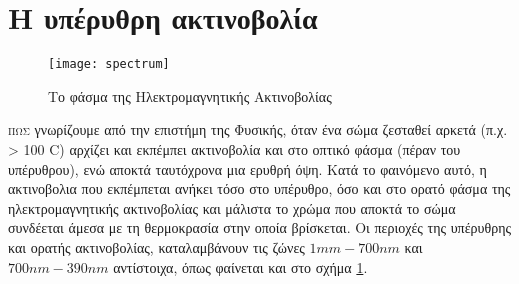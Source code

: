 


\section{Η υπέρυθρη ακτινοβολία}

\begin{figure}
  \centering
  \texttt{[image: spectrum]}
  \caption{Το φάσμα της Ηλεκτρομαγνητικής Ακτινοβολίας}
  \label{fig:spectrum}
\end{figure}

\lettrine[findent=2pt]{}{πως} γνωρίζουμε από την επιστήμη της Φυσικής, όταν ένα σώμα ζεσταθεί αρκετά (π.χ. > 100 \degree C) αρχίζει και εκπέμπει ακτινοβολία και στο οπτικό φάσμα (πέραν του υπέρυθρου), ενώ αποκτά ταυτόχρονα μια ερυθρή όψη. Κατά το φαινόμενο αυτό, η ακτινοβολια που εκπέμπεται ανήκει τόσο στο υπέρυθρο, όσο και στο ορατό φάσμα της ηλεκτρομαγνητικής ακτινοβολίας και μάλιστα το χρώμα που αποκτά το σώμα συνδέεται άμεσα με τη θερμοκρασία στην οποία βρίσκεται. Οι περιοχές της υπέρυθρης και ορατής ακτινοβολίας, καταλαμβάνουν τις ζώνες $1mm - 700nm$ και $700nm - 390nm$ αντίστοιχα, όπως φαίνεται και στο σχήμα \ref{fig:spectrum}.

